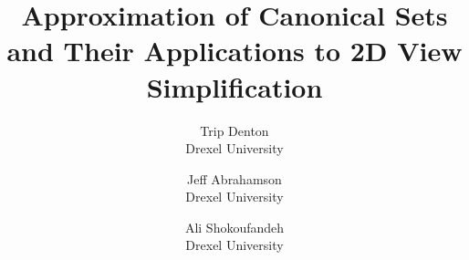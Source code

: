 \documentclass{ieee}
\begin{document}


                    

%



\title{Approximation of Canonical Sets and Their Applications
  to 2D View Simplification }

\author{Trip Denton   \\
Drexel University \\
\and Jeff Abrahamson \\
Drexel University \\
\and Ali Shokoufandeh \\
Drexel University \\
}

 

\maketitle

\thispagestyle{empty}
\end{document}
